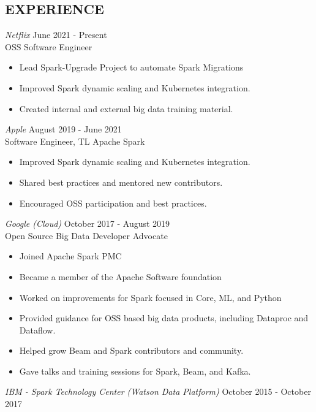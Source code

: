 \documentclass[10pt,line,margin=0.1]{newsres}
\begin{document}
\begin{resume}
\section{EXPERIENCE}
        {\sl Netflix} \hfill June 2021 - Present\\
        OSS Software Engineer
        \begin{itemize}  \itemsep -2pt %
          \item Lead Spark-Upgrade Project to automate Spark Migrations
          \item Improved Spark dynamic scaling and Kubernetes integration.
          \item Created internal and external big data training material.
        \end{itemize}                
        {\sl Apple} \hfill August 2019 - June 2021\\
        Software Engineer, TL Apache Spark
        \begin{itemize}  \itemsep -2pt %
          \item Improved Spark dynamic scaling and Kubernetes integration.
          \item Shared best practices and mentored new contributors.
          \item Encouraged OSS participation and best practices.
        \end{itemize}                
        {\sl Google (Cloud)} \hfill October 2017 - August 2019\\
        Open Source Big Data Developer Advocate
        \begin{itemize}  \itemsep -2pt %
          \item Joined Apache Spark PMC
          \item Became a member of the Apache Software foundation
          \item Worked on improvements for Spark focused in Core, ML, and Python
          \item Provided guidance for OSS based big data products, including Dataproc and Dataflow.
          \item Helped grow Beam and Spark contributors and community.
          \item Gave talks and training sessions for Spark, Beam, and Kafka.
        \end{itemize}
            {\sl IBM - Spark Technology Center (Watson Data Platform)} \hfill October 2015 - October 2017\\

\end{resume}
\end{document}
